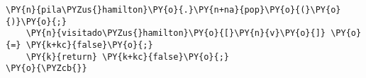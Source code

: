 \begin{Verbatim}[commandchars=\\\{\}]
    \PY{n}{pila\PYZus{}hamilton}\PY{o}{.}\PY{n+na}{pop}\PY{o}{(}\PY{o}{)}\PY{o}{;}
    \PY{n}{visitado\PYZus{}hamilton}\PY{o}{[}\PY{n}{v}\PY{o}{]} \PY{o}{=} \PY{k+kc}{false}\PY{o}{;}
    \PY{k}{return} \PY{k+kc}{false}\PY{o}{;}
\PY{o}{\PYZcb{}}
\end{Verbatim}
